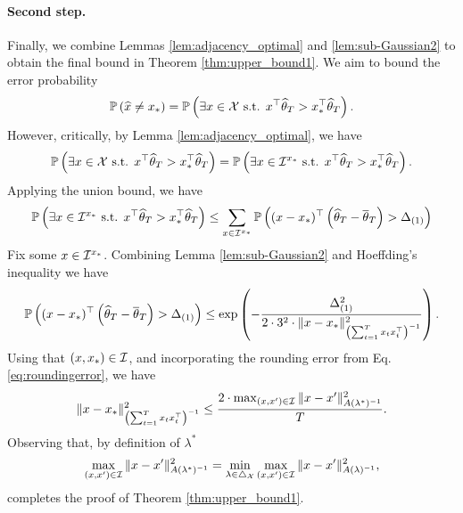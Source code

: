 \paragraph{Second step.}
Finally, we combine Lemmas \ref{lem:adjacency_optimal} and \ref{lem:sub-Gaussian2} to obtain the final bound in Theorem \ref{thm:upper_bound1}. We aim to bound the error probability \begin{equation}
    \mathbb{P}\left(\widehat{x}\neq x_*\right)=\mathbb{P}\left(\exists x 
        \in \mathcal{X}  \text{ s.t. }x^\top\widehat{\theta}_T> x_*^\top\widehat{\theta}_T\right).
\end{equation}
However, critically, by Lemma \ref{lem:adjacency_optimal}, we have \begin{equation}
    \mathbb{P}\left(\exists x 
        \in \mathcal{X}  \text{ s.t. }x^\top\widehat{\theta}_T> x_*^\top\widehat{\theta}_T\right) = \mathbb{P}\left(\exists x\in \mathcal{I}^{x_*}\text{ s.t. }x^\top\widehat{\theta}_T>x_*^\top\widehat{\theta}_T\right).
\end{equation}
Applying the union bound, we have 
\begin{equation}
    \mathbb{P}\left(\exists x\in \mathcal{I}^{x_*}\text{ s.t. }x^\top\widehat{\theta}_T >x_*^\top\widehat{\theta}_T\right)\leq \sum_{x \in \mathcal{I}^{x_*}}\mathbb{P}\left((x-x_*)^\top\left(\widehat{\theta}_T -\overline{\theta}_T\right)>\Delta_{(1)}\right)
\end{equation}
Fix some $x \in \mathcal{I}^{x_*}$. Combining Lemma \ref{lem:sub-Gaussian2} and Hoeffding's inequality we have
\begin{equation}
   \mathbb{P}\left((x-x_*)^\top\left(\widehat{\theta}_T -\overline{\theta}_T\right)>\Delta_{(1)}\right) \leq \exp\left(- \frac{\Delta_{(1)}^2}{2\cdot3^2\cdot\| x-x_*\|_{\left(\sum_{t=1}^Tx_tx_t^\top\right)^{-1}}^2}\right).\end{equation}
Using that $(x,x_*) \in \mathcal{I}$, and incorporating the rounding error from Eq. \eqref{eq:roundingerror}, we have \begin{equation}
    \|x-x_*\|_{\left(\sum_{t=1}^Tx_tx_t^\top\right)^{-1}}^2 \leq \frac{2 \cdot\max_{(x, x') \in \mathcal{I}}\|x - x'\|_{A(\lambda^{*})^{-1}}^2}{T}.
\end{equation}
Observing that, by definition of $\lambda^*$
\begin{equation}
    \max_{(x, x') \in \mathcal{I}}\|x - x'\|_{A(\lambda^{*})^{-1}}^2 = \min_{\lambda \in \triangle_{\mathcal{X}}}\max_{(x, x') \in \mathcal{I}}\|x - x'\|_{A(\lambda)^{-1}}^2,
\end{equation}
completes the proof of Theorem \ref{thm:upper_bound1}.






